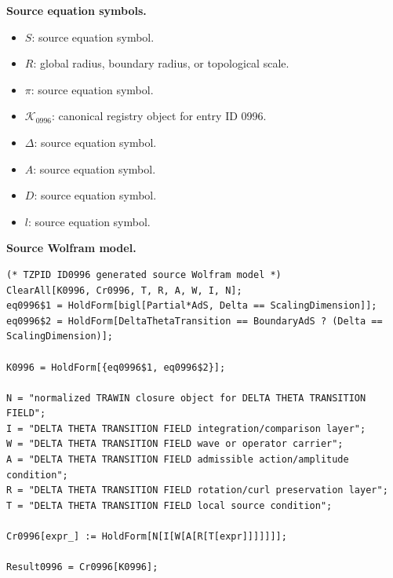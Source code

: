 \begin{minipage}[t]{0.49\linewidth}
\begingroup
\small
\raggedright
\textbf{Source equation symbols.}\par
\begin{itemize}[leftmargin=1.35em,itemsep=1pt,topsep=1pt,parsep=0pt]
    \item $S$: source equation symbol.
    \item $R$: global radius, boundary radius, or topological scale.
    \item $\pi$: source equation symbol.
    \item $\mathcal{K}_{0996}$: canonical registry object for entry ID 0996.
    \item $\Delta$: source equation symbol.
    \item $A$: source equation symbol.
    \item $D$: source equation symbol.
    \item $l$: source equation symbol.
\end{itemize}
\endgroup
\end{minipage}\hfill
\begin{minipage}[t]{0.47\linewidth}
\begingroup
\scriptsize
\raggedright
\textbf{Source Wolfram model.}\par
\begin{Verbatim}[fontsize=\tiny,breaklines=true,breakanywhere=true]
(* TZPID ID0996 generated source Wolfram model *)
ClearAll[K0996, Cr0996, T, R, A, W, I, N];
eq0996$1 = HoldForm[bigl[Partial*AdS, Delta == ScalingDimension]];
eq0996$2 = HoldForm[DeltaThetaTransition == BoundaryAdS ? (Delta == ScalingDimension)];

K0996 = HoldForm[{eq0996$1, eq0996$2}];

N = "normalized TRAWIN closure object for DELTA THETA TRANSITION FIELD";
I = "DELTA THETA TRANSITION FIELD integration/comparison layer";
W = "DELTA THETA TRANSITION FIELD wave or operator carrier";
A = "DELTA THETA TRANSITION FIELD admissible action/amplitude condition";
R = "DELTA THETA TRANSITION FIELD rotation/curl preservation layer";
T = "DELTA THETA TRANSITION FIELD local source condition";

Cr0996[expr_] := HoldForm[N[I[W[A[R[T[expr]]]]]]];

Result0996 = Cr0996[K0996];
\end{Verbatim}
\endgroup
\end{minipage}

